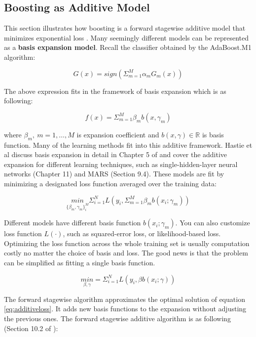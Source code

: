 \documentclass[
  12pt,
]{krantz}
\begin{document}
\hypertarget{boosting-as-additive-model}{%
\subsection{Boosting as Additive Model}\label{boosting-as-additive-model}}

This section illustrates how boosting is a forward stagewise additive model that minimizes exponential loss \citep{Friedman2000}. Many seemingly different models can be represented as a \textbf{basis expansion model}. Recall the classifier obtained by the AdaBoost.M1 algorithm:

\[G(x)=sign ( \Sigma_{m=1}^M \alpha_{m}G_m(x))\]

The above expression fits in the framework of basis expansion which is as following:

\begin{equation}
f(x)=\Sigma_{m=1}^M \beta_m b(x,\gamma_m)
\label{eq:basisexp}
\end{equation}

where \(\beta_m,\ m=1,\dots,M\) is expansion coefficient and \(b(x,\gamma)\in \mathbb{R}\) is basis function. Many of the learning methods fit into this additive framework. Hastie et al discuss basis expansion in detail in Chapter 5 of \citet{Hastie2008} and cover the additive expansion for different learning techniques, such as single-hidden-layer neural networks (Chapter 11) and MARS (Section 9.4). These models are fit by minimizing a designated loss function averaged over the training data:

\begin{equation}
\underset{\{\beta_m,\gamma_m\}_i^M}{min}\Sigma_{i=1}^N L\left(y_i,\Sigma_{m=1}^M\beta_{m}b(x_i;\gamma_m)\right)
\label{eq:additiveloss}
\end{equation}

Different models have different basis function \(b(x_i;\gamma_m)\). You can also customize loss function \(L(\cdot)\), such as squared-error loss, or likelihood-based loss. Optimizing the loss function across the whole training set is usually computation costly no matter the choice of basis and loss. The good news is that the problem can be simplified as fitting a single basis function.

\[\underset{\beta,\gamma}{min}=\Sigma_{i=1}^N L(y_i,\beta b(x_i;\gamma))\]

The forward stagewise algorithm approximates the optimal solution of equation \eqref{eq:additiveloss}. It adds new basis functions to the expansion without adjusting the previous ones. The forward stagewise additive algorithm is as following (Section 10.2 of \citet{Hastie2008}):
\end{document}
